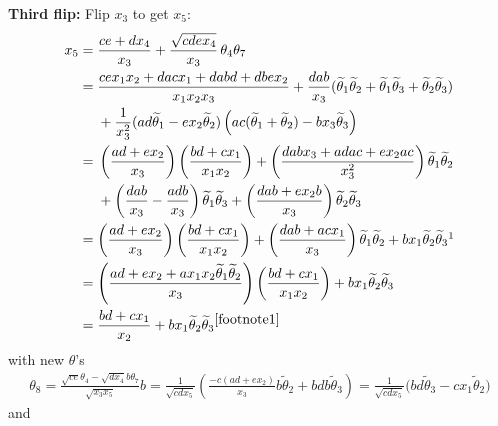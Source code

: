 {\allowdisplaybreaks \textbf{Third flip:} Flip $x_3$ to get $x_5$:
\begin{align*}
 x_5={} & \frac{ce + dx_4}{x_3} + \frac{\sqrt{cdex_4}}{x_3} \, \theta_4 \theta_7 \\
={} & \frac{cex_1 x_2 + dac x_1 + d a b d + dbex_2}{x_1 x_2 x_3} +
 \frac{dab}{x_3}( \widetilde{\theta}_1\widetilde{\theta}_2 + \widetilde{\theta}_1\widetilde{\theta}_3 +
 \widetilde{\theta}_2 \widetilde{\theta}_3) \\
& {}+ { \frac{1}{x_3^2} (ad \widetilde{\theta}_1 - ex_2 \widetilde{\theta}_2)\left( ac(\widetilde{\theta}_1 + \widetilde{\theta}_2)
 - bx_3 \widetilde{\theta}_3\right) } \\
={} & \left(\frac{ad + ex_2}{x_3}\right)\left(\frac{bd+cx_1}{x_1x_2}\right)
 + \left(\frac{dabx_3 +adac + ex_2 ac}{x_3^2}\right)\widetilde{\theta}_1 \widetilde{\theta}_2 \\
 & {}
 + \left(\frac{dab}{x_3} - \frac{adb}{x_3}\right) \widetilde{\theta}_1 \widetilde{\theta}_3
 + \left(\frac{dab + ex_2 b}{x_3}\right) \widetilde{\theta}_2 \widetilde{\theta}_3 \\
={} &{ \left(\frac{ad + ex_2}{x_3}\right)\left(\frac{bd+cx_1}{x_1x_2}\right)
 + \left(\frac{dab + acx_1}{x_3}\right)\widetilde{\theta}_1 \widetilde{\theta}_2 %
 + %
 b x_1 \widetilde{\theta}_2 \widetilde{\theta}_3 }\footnotemark \\
={} & { \left(\frac{ad + ex_2 + a x_1x_2 \widetilde{\theta}_1 \widetilde{\theta}_2}{x_3}\right)\left(\frac{bd+cx_1}{x_1x_2}\right)
 + %
 b x_1 \widetilde{\theta}_2 \widetilde{\theta}_3 } \\
={} & \frac{bd+cx_1}{x_2} + bx_1 \widetilde{\theta}_2 \widetilde{\theta}_3{}^{\ref{footnote1}}
\end{align*}
$\!\!$with new $\theta$'s
\begin{align*}
 \theta_8 = \frac{\sqrt{ce} \theta_4 - \sqrt{dx_4} b \theta_7}{\sqrt{x_3x_5}} b
 = \frac{1}{\sqrt{cdx_5}} \left( \frac{-c(ad+ex_2)}{x_3} b \widetilde{\theta}_2 + bd b \widetilde{\theta}_3 \right)
 = \frac{1}{\sqrt{cdx_5}} \big( bd \widetilde{\theta}_3 - cx_1 \widetilde{\theta}_2 \big)
\end{align*}
and
\begin{align*}

\end{align*}}
